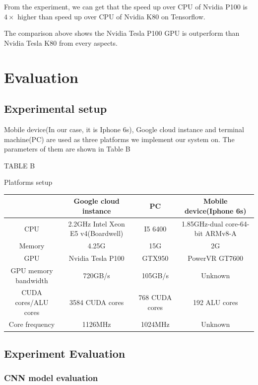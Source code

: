 \documentclass[conference]{IEEEtran}
\begin{document}
From the experiment, we can get that the speed up over CPU of Nvidia P100 is $4 \times$ higher than speed up over CPU of Nvidia K80 on Tensorflow. 

The comparison above shows the Nvidia Tesla P100 GPU is outperform than Nvidia Tesla K80 from every aspects. 

\section{Evaluation}

\subsection{Experimental setup}

Mobile device(In our case, it is Iphone 6s), Google cloud instance and terminal machine(PC) are used as three platforms we implement our system on. The parameters of them are shown in Table B  


\begin{table}
\centerline { TABLE B  } 
\vskip5pt
\centerline { Platforms setup}
\vskip2pt
\centering
\begin{tabular}{c|c|c|c}
\toprule
\textbf{} & \textbf{Google cloud instance }&\textbf{ PC }&
\textbf{Mobile device(Iphone 6s)}\\
\midrule
CPU & 2.2GHz Intel Xeon E5 v4(Boardwell) & I5 6400 & 1.85GHz-dual core-64-bit ARMv8-A \\
\hline
Memory & 4.25G & 15G & 2G\\
\hline
GPU & Nvidia Tesla P100   & GTX950 & PowerVR GT7600 \\
\hline
GPU memory bandwidth & 720GB/s & 105GB/s & Unknown \\ 
\hline
CUDA cores/ALU cores & 3584 CUDA cores & 768 CUDA cores & 192 ALU cores \\
\hline
Core frequency & 1126MHz & 1024MHz & Unknown \\
\bottomrule
\end{tabular}
\end{table}


\subsection{Experiment Evaluation}

\subsubsection{CNN model evaluation}
\end{document}

